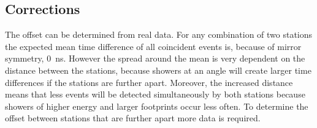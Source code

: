 \subsection{Corrections}

The offset can be determined from real data. For any combination of two
stations the expected mean time difference of all coincident events is,
because of mirror symmetry, \SI{0}{\nano\second}. However the spread
around the mean is very dependent on the distance between the stations,
because showers at an angle will create larger time differences if the
stations are further apart. Moreover, the increased distance means that
less events will be detected simultaneously by both stations because
showers of higher energy and larger footprints occur less often. To
determine the offset between stations that are further apart more data
is required.

